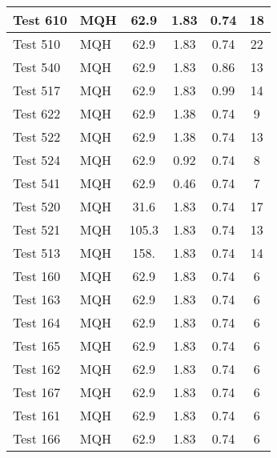 \begin{table}[!ht]
\begin{center}
\begin{tabular}{|l|l|c|c|c|c|}
Test 610   &  MQH               &  62.9           &  1.83            &  0.74            &  18                \\ \hline
Test 510   &  MQH               &  62.9           &  1.83            &  0.74            &  22                \\ \hline
Test 540   &  MQH               &  62.9           &  1.83            &  0.86            &  13                \\ \hline
Test 517   &  MQH               &  62.9           &  1.83            &  0.99            &  14                \\ \hline
Test 622   &  MQH               &  62.9           &  1.38            &  0.74            &  9                 \\ \hline
Test 522   &  MQH               &  62.9           &  1.38            &  0.74            &  13                \\ \hline
Test 524   &  MQH               &  62.9           &  0.92            &  0.74            &  8                 \\ \hline
Test 541   &  MQH               &  62.9           &  0.46            &  0.74            &  7                 \\ \hline
Test 520   &  MQH               &  31.6           &  1.83            &  0.74            &  17                \\ \hline
Test 521   &  MQH               &  105.3          &  1.83            &  0.74            &  13                \\ \hline
Test 513   &  MQH               &  158.           &  1.83            &  0.74            &  14                \\ \hline
Test 160   &  MQH               &  62.9           &  1.83            &  0.74            &  6                 \\ \hline
Test 163   &  MQH               &  62.9           &  1.83            &  0.74            &  6                 \\ \hline
Test 164   &  MQH               &  62.9           &  1.83            &  0.74            &  6                 \\ \hline
Test 165   &  MQH               &  62.9           &  1.83            &  0.74            &  6                 \\ \hline
Test 162   &  MQH               &  62.9           &  1.83            &  0.74            &  6                 \\ \hline
Test 167   &  MQH               &  62.9           &  1.83            &  0.74            &  6                 \\ \hline
Test 161   &  MQH               &  62.9           &  1.83            &  0.74            &  6                 \\ \hline
Test 166   &  MQH               &  62.9           &  1.83            &  0.74            &  6                 \\ \hline
\end{tabular}
\end{center}
\end{table}


